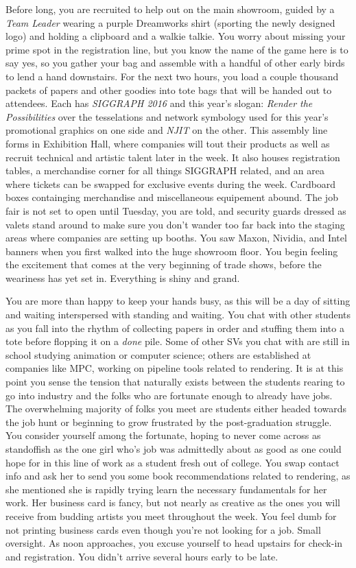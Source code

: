 \documentclass[../main.tex]{subfiles}
\begin{document}
Before long, you are recruited to help out on the main showroom, guided by a \textit{Team Leader} wearing a purple Dreamworks shirt (sporting the newly designed logo) and holding a clipboard and a walkie talkie. You worry about missing your prime spot in the registration line, but you know the name of the game here is to say yes, so you gather your bag and assemble with a handful of other early birds to lend a hand downstairs. For the next two hours, you load a couple thousand packets of papers and other goodies into tote bags that will be handed out to attendees. Each has \textit{SIGGRAPH 2016} and this year's slogan: \textit{Render the Possibilities} over the tesselations and network symbology used for this year's promotional graphics on one side and \textit{NJIT} on the other. This assembly line forms in Exhibition Hall, where companies will tout their products as well as recruit technical and artistic talent later in the week. It also houses registration tables, a merchandise corner for all things SIGGRAPH related, and an area where tickets can be swapped for exclusive events during the week. Cardboard boxes containging merchandise and miscellaneous equipement abound. The job fair is not set to open until Tuesday, you are told, and security guards dressed as valets stand around to make sure you don't wander too far back into the staging areas where companies are setting up booths. You saw Maxon, Nividia, and Intel banners when you first walked into the huge showroom floor. You begin feeling the excitement that comes at the very beginning of trade shows, before the weariness has yet set in. Everything is shiny and grand.

You are more than happy to keep your hands busy, as this will be a day of sitting and waiting interspersed with standing and waiting. You chat with other students as you fall into the rhythm of collecting papers in order and stuffing them into a tote before flopping it on a \textit{done} pile. Some of other SVs you chat with are still in school studying animation or computer science; others are established at companies like MPC, working on pipeline tools related to rendering. It is at this point you sense the tension that naturally exists between the students rearing to go into industry and the folks who are fortunate enough to already have jobs. The overwhelming majority of folks you meet are students either headed towards the job hunt or beginning to grow frustrated by the post-graduation struggle. You consider yourself among the fortunate, hoping to never come across as standoffish as the one girl who's job was admittedly about as good as one could hope for in this line of work as a student fresh out of college. You swap contact info and ask her to send you some book recommendations related to rendering, as she mentioned she is rapidly trying learn the necessary fundamentals for her work. Her business card is fancy, but not nearly as creative as the ones you will receive from budding artists you meet throughout the week. You feel dumb for not printing business cards even though you're not looking for a job. Small oversight. As noon approaches, you excuse yourself to head upstairs for check-in and registration. You didn't arrive several hours early to be late.
\end{document}
